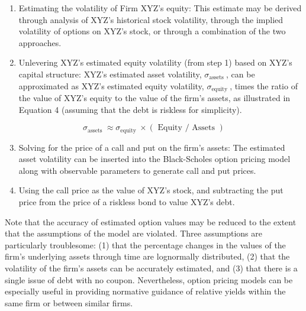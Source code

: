 \documentclass[11pt]{article}
\begin{document}
\begin{enumerate}
  \item Estimating the volatility of Firm XYZ's equity: This estimate may be derived through analysis of XYZ's historical stock volatility, through the implied volatility of options on XYZ's stock, or through a combination of the two approaches.

  \item Unlevering XYZ's estimated equity volatility (from step 1) based on XYZ's capital structure: XYZ's estimated asset volatility, $\sigma_{\text {assets }}$, can be approximated as XYZ's estimated equity volatility, $\sigma_{\text {equity }}$, times the ratio of the value of XYZ's equity to the value of the firm's assets, as illustrated in Equation 4 (assuming that the debt is riskless for simplicity).

\end{enumerate}


\begin{equation*}
\sigma_{\text {assets }} \approx \sigma_{\text {equity }} \times(\text { Equity } / \text { Assets }) \tag{4}
\end{equation*}


\begin{enumerate}
  \setcounter{enumi}{2}
  \item Solving for the price of a call and put on the firm's assets: The estimated asset volatility can be inserted into the Black-Scholes option pricing model along with observable parameters to generate call and put prices.

  \item Using the call price as the value of XYZ's stock, and subtracting the put price from the price of a riskless bond to value XYZ's debt.

\end{enumerate}

Note that the accuracy of estimated option values may be reduced to the extent that the assumptions of the model are violated. Three assumptions are particularly troublesome: (1) that the percentage changes in the values of the firm's underlying assets through time are lognormally distributed, (2) that the volatility of the firm's assets can be accurately estimated, and (3) that there is a single issue of debt with no coupon. Nevertheless, option pricing models can be especially useful in providing normative guidance of relative yields within the same firm or between similar firms.
\end{document}
